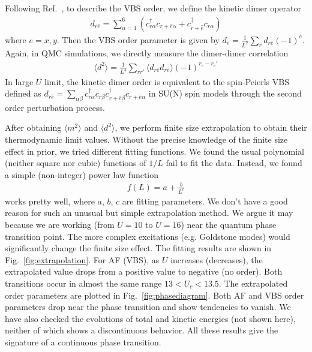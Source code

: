 \documentclass[twocolumn,superscriptaddress,prb]{revtex4-1}
\begin{document}
Following Ref.~, to describe the VBS order, we define the kinetic dimer operator
\begin{eqnarray}
  d_{r\hat{e}}=\sum_{\alpha=1}^{6}\left(c_{r\alpha}^\dag c_{r+\hat{e}\alpha} + c_{r+\hat{e}}^\dag c_{r\alpha} \right)
\end{eqnarray}
where $e=x,y$. Then the VBS order parameter is given by $d_e=\frac{1}{L^2}\sum_r d_{r\hat{e}}(-1)^e$. Again, in QMC simulations, we directly measure the dimer-dimer correlation 
\begin{eqnarray}
  \langle d^2 \rangle=\frac{1}{L^4}\sum_{rr'} \langle d_{r\hat{e}}d_{r\hat{e}}\rangle (-1)^{r_e-r_e'}
\end{eqnarray}
In large $U$ limit, the kinetic dimer order is equivalent to the spin-Peierls VBS defined as $d_{r\hat{e}}=\sum_{\alpha\beta}c_{r\alpha}^\dag c_{r\beta} c_{r+\hat{e}\beta}^\dag c_{r+\hat{e}\alpha}$ in SU(N) spin models \cite{Read_PRL_1989,*Read_NPB_1989,*Read_PRB_1990,Marston_PRB_1989} through the second order perturbation process.




After obtaining $\langle m^2 \rangle$ and $\langle d^2 \rangle$, we perform finite size extrapolation to obtain their thermodynamic limit values. Without the precise knowledge of the finite size effect in prior, we tried different fitting functions. We found the usual polynomial (neither square nor cubic) functions of $1/L$ \cite{Neuberger_PRB_1989,Sandvik_PRB_1997} fail to fit the data. Instead, we found a simple (non-integer) power law function
\begin{eqnarray}\label{eq:fitting}
f(L)=a+\frac{b}{L^c}
\end{eqnarray}
works pretty well, where $a$, $b$, $c$ are fitting parameters. We don't have a good reason for such an unusual but simple extrapolation method. We argue it may because we are working (from $U=10$ to $U=16$) near the quantum phase transition point. The more complex excitations (e.g. Goldstone modes) would significantly change the finite size effect. The fitting results are shown in Fig.~\ref{fig:extrapolation}. For AF (VBS), as $U$ increases (decreases), the extrapolated value drops from a positive value to negative (no order). Both transitions occur in almost the same range $13<U_c<13.5$. The extrapolated order parameters are plotted in Fig.~\ref{fig:phasediagram}. Both AF and VBS order parameters drop near the phase transition and show tendencies to vanish. We have also checked the evolutions of total and kinetic energies (not shown here), neither of which shows a discontinuous behavior. All these results give the signature of a continuous phase transition.
\end{document}
